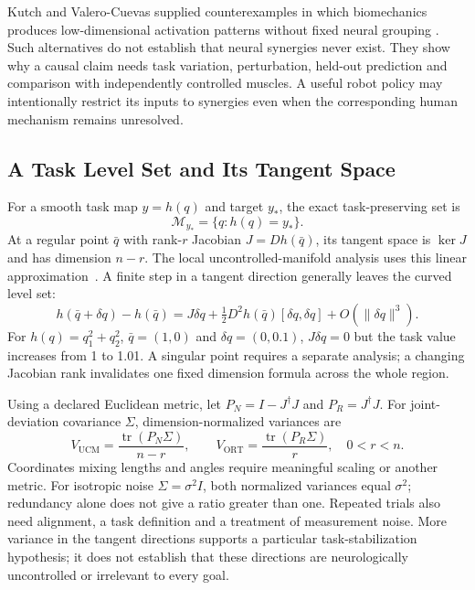 Kutch and Valero-Cuevas supplied counterexamples in which biomechanics
produces low-dimensional activation patterns without fixed neural grouping
\cite{KutchValeroCuevas2012}. Such alternatives do not establish that neural
synergies never exist. They show why a causal claim needs task variation,
perturbation, held-out prediction and comparison with independently controlled
muscles. A useful robot policy may intentionally restrict its inputs to
synergies even when the corresponding human mechanism remains unresolved.

\subsection{A Task Level Set and Its Tangent Space}

For a smooth task map $y=h(q)$ and target $y_*$, the exact task-preserving set is
\begin{equation}
\mathcal M_{y_*}=\{q:h(q)=y_*\}.
\label{eq:ch8:ucm}
\end{equation}
At a regular point $\bar q$ with rank-$r$ Jacobian $J=Dh(\bar q)$, its tangent
space is $\ker J$ and has dimension $n-r$. The local uncontrolled-manifold
analysis uses this linear approximation~\cite{ScholzSchoner1999}. A finite step
in a tangent direction generally leaves the curved level set:
\begin{equation}
h(\bar q+\delta q)-h(\bar q)
=J\delta q+\tfrac12 D^2h(\bar q)[\delta q,\delta q]
+O(\|\delta q\|^3).
\end{equation}
For $h(q)=q_1^2+q_2^2$, $\bar q=(1,0)$ and $\delta q=(0,0.1)$,
$J\delta q=0$ but the task value increases from 1 to 1.01. A singular point
requires a separate analysis; a changing Jacobian rank invalidates one fixed
dimension formula across the whole region.

Using a declared Euclidean metric, let $P_N=I-J^\dagger J$ and
$P_R=J^\dagger J$. For joint-deviation covariance $\Sigma$, dimension-normalized
variances are
\begin{equation}
V_{\mathrm{UCM}}=\frac{\operatorname{tr}(P_N\Sigma)}{n-r},\qquad
V_{\mathrm{ORT}}=\frac{\operatorname{tr}(P_R\Sigma)}{r},
\quad 0<r<n.
\label{eq:ch8:ucm-variance}
\end{equation}
Coordinates mixing lengths and angles require meaningful scaling or another
metric. For isotropic noise $\Sigma=\sigma^2I$, both normalized variances equal
$\sigma^2$; redundancy alone does not give a ratio greater than one. Repeated
trials also need alignment, a task definition and a treatment of measurement
noise. More variance in the tangent directions supports a particular
task-stabilization hypothesis; it does not establish that these directions
are neurologically uncontrolled or irrelevant to every goal.

